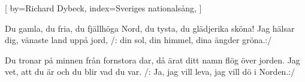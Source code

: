 

[
by={Richard Dybeck},
index={Sveriges nationalsång},
]

\beginverse*
 Du gamla, du fria, du fjällhöga Nord,
du tysta, du glädjerika sköna!
Jag hälsar dig, vänaste land uppå jord,
/: din sol, din himmel, dina ängder gröna.:/
\endverse

\beginverse*
Du tronar på minnen från fornstora dar, 
då ärat ditt namn flög över jorden.
Jag vet, att du är och du blir vad du var.
/: Ja, jag vill leva, jag vill dö i Norden.:/
\endverse
\endsong


